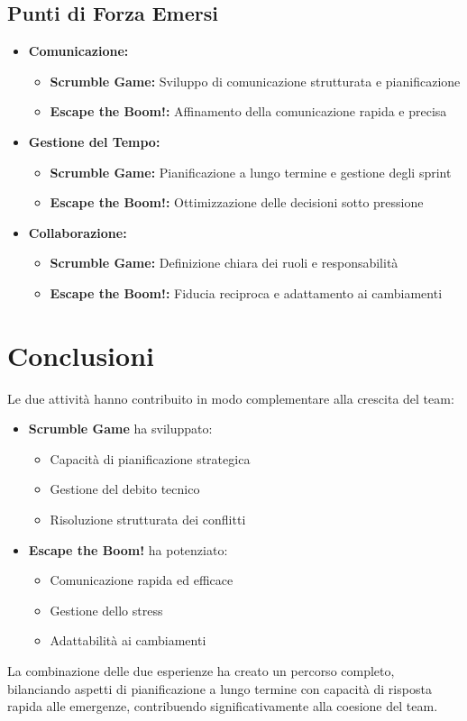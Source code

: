 \documentclass{article}
\begin{document}
\subsection*{Punti di Forza Emersi}
\begin{itemize}[leftmargin=1em]
    \item \textbf{Comunicazione:}
    \begin{itemize}[leftmargin=1em]
        \item \textbf{Scrumble Game:} Sviluppo di comunicazione strutturata e pianificazione
        \item \textbf{Escape the Boom!:} Affinamento della comunicazione rapida e precisa
    \end{itemize}
    
    \item \textbf{Gestione del Tempo:}
    \begin{itemize}[leftmargin=1em]
        \item \textbf{Scrumble Game:} Pianificazione a lungo termine e gestione degli sprint
        \item \textbf{Escape the Boom!:} Ottimizzazione delle decisioni sotto pressione
    \end{itemize}
    
    \item \textbf{Collaborazione:}
    \begin{itemize}[leftmargin=1em]
        \item \textbf{Scrumble Game:} Definizione chiara dei ruoli e responsabilità
        \item \textbf{Escape the Boom!:} Fiducia reciproca e adattamento ai cambiamenti
    \end{itemize}
\end{itemize}

\section*{Conclusioni}
Le due attività hanno contribuito in modo complementare alla crescita del team:

\begin{itemize}
    \item \textbf{Scrumble Game} ha sviluppato:
    \begin{itemize}
        \item Capacità di pianificazione strategica
        \item Gestione del debito tecnico
        \item Risoluzione strutturata dei conflitti
    \end{itemize}
    
    \item \textbf{Escape the Boom!} ha potenziato:
    \begin{itemize}
        \item Comunicazione rapida ed efficace
        \item Gestione dello stress
        \item Adattabilità ai cambiamenti
    \end{itemize}
\end{itemize}

La combinazione delle due esperienze ha creato un percorso completo, bilanciando 
aspetti di pianificazione a lungo termine con capacità di risposta rapida alle 
emergenze, contribuendo significativamente alla coesione del team.
\end{document}
